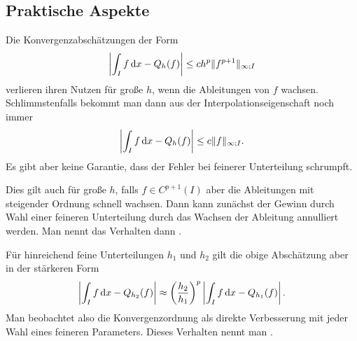 \subsection{Praktische Aspekte}

\begin{remark}
  Die Konvergenzabschätzungen der Form
  \begin{gather}
    \left|\int_I f\,\mathrm{d} x - Q_h(f)\right| \le c h^p \lVert f^{p+1}\rVert_{\infty;I}
  \end{gather}
  verlieren ihren Nutzen für große $h$, wenn die Ableitungen von $f$
  wachsen. Schlimmstenfalls bekommt man dann aus der
  Interpolationseigenschaft noch immer
  \begin{gather}
    \left|\int_I f\,\mathrm{d} x - Q_h(f)\right| \le c \lVert f\rVert_{\infty;I}.
  \end{gather}
  Es gibt aber keine Garantie, dass der Fehler bei feinerer
  Unterteilung schrumpft.

  Dies gilt auch für große $h$, falls $f\in C^{p+1}(I)$ aber die
  Ableitungen mit steigender Ordnung schnell wachsen. Dann kann
  zunächst der Gewinn durch Wahl einer feineren Unterteilung durch das
  Wachsen der Ableitung annulliert werden. Man nennt das Verhalten
  dann .

Für hinreichend feine Unterteilungen $h_1$ und $h_2$ gilt die obige
Abschätzung aber in der stärkeren Form
  \begin{gather}
    \left|\int_I f\,\mathrm{d} x - Q_{h_2}(f)\right|
    \approx \left(\frac{h_2}{h_1}\right)^p
    \left|\int_I f\,\mathrm{d} x - Q_{h_1}(f)\right|.
  \end{gather}
  Man beobachtet also die Konvergenzordnung als direkte Verbesserung
  mit jeder Wahl eines feineren Parameters. Dieses Verhalten nennt man
  .
\end{remark}

